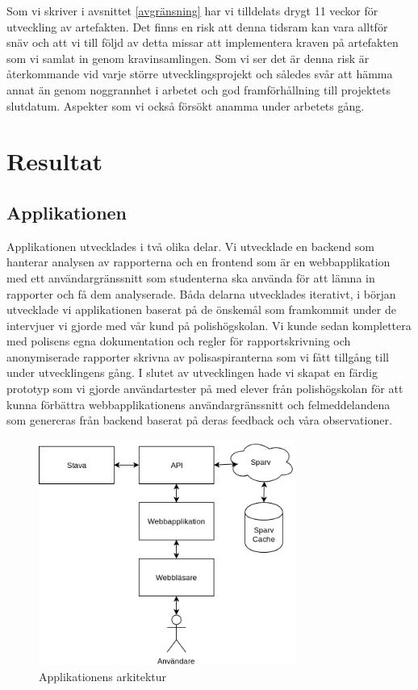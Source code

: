 \documentclass[swedish]{maucsthesis}
\begin{document}
Som vi skriver i avsnittet \ref{avgränsning} har vi tilldelats drygt 11 veckor
för utveckling av artefakten. Det finns en risk att denna tidsram kan vara
alltför snäv och att vi till följd av detta missar att implementera kraven på
artefakten som vi samlat in genom kravinsamlingen. Som vi ser det är denna risk
är återkommande vid varje större utvecklingsprojekt och således svår att hämma
annat än genom noggrannhet i arbetet och god framförhållning till projektets
slutdatum. Aspekter som vi också försökt anamma under arbetets gång.


\section{Resultat}
\subsection{Applikationen}\label{applikationen}

Applikationen utvecklades i två olika delar. Vi utvecklade en backend som hanterar
analysen av rapporterna och en frontend som är en webbapplikation med ett
användargränssnitt som studenterna ska använda för att lämna in
rapporter och få dem analyserade. Båda delarna utvecklades iterativt, i
början utvecklade vi applikationen baserat på de önskemål som framkommit under
de intervjuer vi gjorde med vår kund på polishögskolan. Vi kunde sedan komplettera
med polisens egna dokumentation och regler för rapportskrivning och
anonymiserade rapporter skrivna av polisaspiranterna som vi fått tillgång till
under utvecklingens gång. I slutet av utvecklingen hade vi skapat en färdig
prototyp som vi gjorde användartester på med elever från polishögskolan för att
kunna förbättra webbapplikationens användargränssnitt och felmeddelandena som
genereras från backend baserat på deras feedback och våra observationer.

\begin{figure}[H]
    \centering
    \includegraphics[width=0.75\textwidth]{architecture.png}
    \caption{Applikationens arkitektur}
    \label{fig:architecture}
\end{figure}
\end{document}
